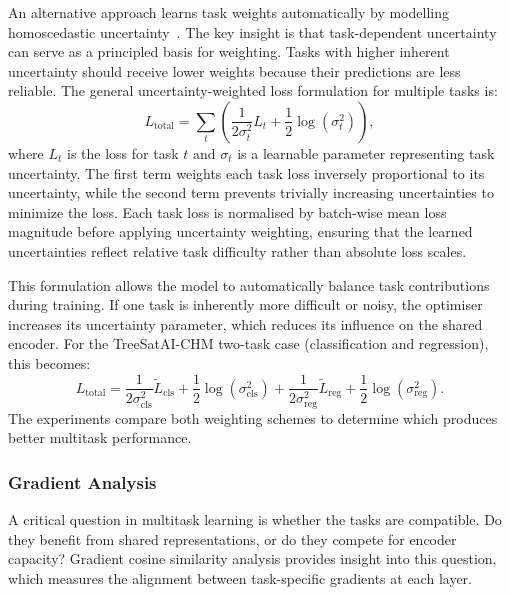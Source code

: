 An alternative approach learns task weights automatically by modelling homoscedastic uncertainty~\cite{kendall_multi-task_2017}. The key insight is that task-dependent uncertainty can serve as a principled basis for weighting. Tasks with higher inherent uncertainty should receive lower weights because their predictions are less reliable. The general uncertainty-weighted loss formulation for multiple tasks is:
\begin{equation}
    L_{\text{total}} = \sum_t \left( \frac{1}{2\sigma_t^2} L_t + \frac{1}{2} \log(\sigma_t^2) \right),
\end{equation}
where $L_t$ is the loss for task $t$ and $\sigma_t$ is a learnable parameter representing task uncertainty. The first term weights each task loss inversely proportional to its uncertainty, while the second term prevents trivially increasing uncertainties to minimize the loss. Each task loss is normalised by batch-wise mean loss magnitude before applying uncertainty weighting, ensuring that the learned uncertainties reflect relative task difficulty rather than absolute loss scales.

This formulation allows the model to automatically balance task contributions during training. If one task is inherently more difficult or noisy, the optimiser increases its uncertainty parameter, which reduces its influence on the shared encoder. For the TreeSatAI-CHM two-task case (classification and regression), this becomes:
\begin{equation}
    L_{\text{total}} = \frac{1}{2\sigma_{\text{cls}}^2} \tilde{L}_{\text{cls}} + \frac{1}{2} \log(\sigma_{\text{cls}}^2) + \frac{1}{2\sigma_{\text{reg}}^2} \tilde{L}_{\text{reg}} + \frac{1}{2} \log(\sigma_{\text{reg}}^2).
\end{equation}
The experiments compare both weighting schemes to determine which produces better multitask performance.

\subsubsection{Gradient Analysis}

A critical question in multitask learning is whether the tasks are compatible. Do they benefit from shared representations, or do they compete for encoder capacity? Gradient cosine similarity analysis provides insight into this question, which measures the alignment between task-specific gradients at each layer.

